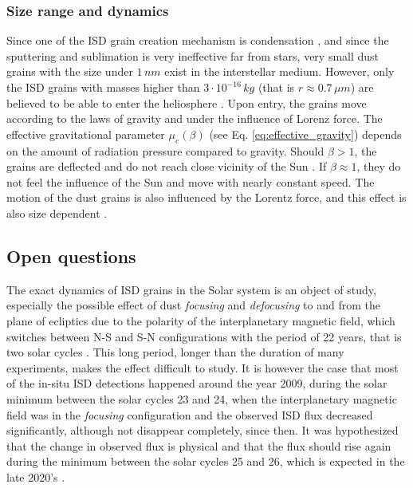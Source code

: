 \subsubsection{Size range and dynamics}

Since one of the ISD grain creation mechanism is condensation \citep{mann2010interstellar}, and since the sputtering and sublimation is very ineffective far from stars, very small dust grains with the size under $1 \, \si{nm}$ exist in the interstellar medium. However, only the ISD grains with masses higher than $3\cdot 10^{-16} \, \si{kg}$ (that is $r \approx 0.7 \, \si{\mu m} $) are believed to be able to enter the heliosphere \citep{kimura1998electric}. Upon entry, the grains move according to the laws of gravity and under the influence of Lorenz force. The effective gravitational parameter $\mu_e(\beta)$ (see Eq. \ref{eq:effective_gravity}) depends on the amount of radiation pressure compared to gravity. Should $\beta > 1$, the grains are deflected and do not reach close vicinity of the Sun \citep{henriksen2022interstellar}. If $\beta \approx 1$, they do not feel the influence of the Sun and move with nearly constant speed. The motion of the dust grains is also influenced by the Lorentz force, and this effect is also size dependent \cite{morfill1979motion}.

\subsection{Open questions}

The exact dynamics of ISD grains in the Solar system is an object of study, especially the possible effect of dust \textit{focusing} and \textit{defocusing} to and from the plane of ecliptics due to the polarity of the interplanetary magnetic field, which switches between N-S and S-N configurations with the period of 22 years, that is two solar cycles \citep{morfill1979motion}. This long period, longer than the duration of many experiments, makes the effect difficult to study. It is however the case that most of the in-situ ISD detections happened around the year 2009, during the solar minimum between the solar cycles 23 and 24, when the interplanetary magnetic field was in the \textit{focusing} configuration \citep{babic2022situ} and the observed ISD flux decreased significantly, although not disappear completely, since then. It was hypothesized that the change in observed flux is physical and that the flux should rise again during the minimum between the solar cycles 25 and 26, which is expected in the late 2020's \citep{mann2010interstellar}. 

